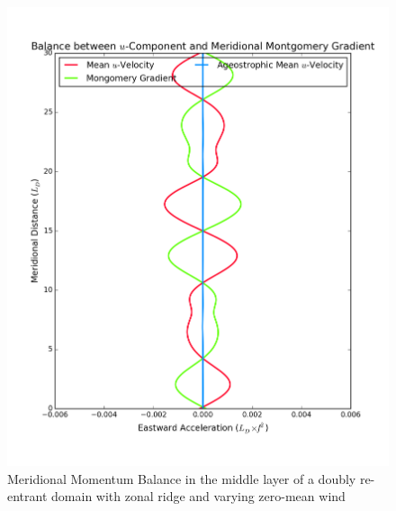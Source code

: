 \documentclass[12pt,a4paper]{report}
\begin{document}
\begin{figure}
\begin{minipage}[b]{0.45\linewidth}
  		\includegraphics[width=\linewidth ]{vgeo_2}
  		\caption{Meridional Momentum Balance in the middle layer of 
  			a doubly re-entrant domain with 
  			zonal ridge and varying zero-mean wind}
  		\label{fig:vgeolayer2}
  	\end{minipage}
  \end{figure}
  
\end{document}
